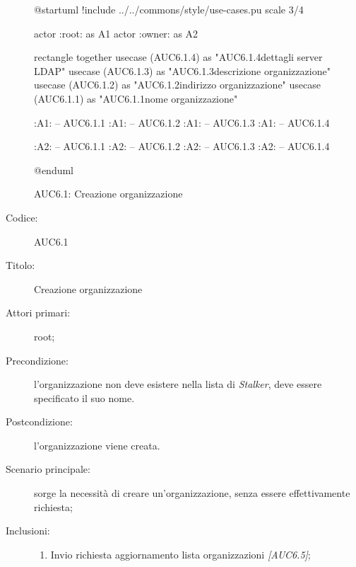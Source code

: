 \documentclass[casi-duso]{subfiles}
\begin{document}
  \begin{figure}[h!]
    \centering
    \begin{plantuml}
    @startuml
    !include ../../commons/style/use-cases.pu
    scale 3/4

    actor :root: as A1
    actor :owner: as A2


    rectangle {
      together {
        usecase (AUC6.1.4) as "AUC6.1.4\nConfigurazione dettagli server LDAP"
        usecase (AUC6.1.3) as "AUC6.1.3\nInserisci descrizione organizzazione"
        usecase (AUC6.1.2) as "AUC6.1.2\nInserisci indirizzo organizzazione"
        usecase (AUC6.1.1) as "AUC6.1.1\nInserisci nome organizzazione"
      }
    }

    :A1: -- AUC6.1.1
    :A1: -- AUC6.1.2
    :A1: -- AUC6.1.3
    :A1: -- AUC6.1.4

    :A2: -- AUC6.1.1
    :A2: -- AUC6.1.2
    :A2: -- AUC6.1.3
    :A2: -- AUC6.1.4

    @enduml
    \end{plantuml}
    \caption{AUC6.1: Creazione organizzazione}
    \label{fig:auc6_1}
  \end{figure}

  \begin{description}
    \item[Codice:] AUC6.1
    \item[Titolo:] Creazione organizzazione
    \item[Attori primari:] root;
    \item[Precondizione:] l'organizzazione non deve esistere nella lista di \emph{Stalker}, deve essere specificato il suo nome.
    \item[Postcondizione:] l'organizzazione viene creata.
    \item[Scenario principale:] sorge la necessità di creare un'organizzazione, senza essere effettivamente richiesta;
    \item[Inclusioni:]
    \begin{enumerate}
      \item Invio richiesta aggiornamento lista organizzazioni \emph{[AUC6.5]};
    \end{enumerate}
  \end{description}
\end{document}
